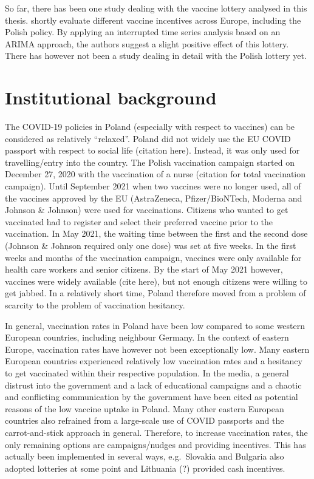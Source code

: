 \documentclass{scrbook}
\begin{document}
So far, there has been one study dealing with the vaccine lottery
analysed in this thesis. \textcite{kuznetsova_effectiveness_2022}
shortly evaluate different vaccine incentives across Europe, including
the Polish policy. By applying an interrupted time series analysis based
on an ARIMA approach, the authors suggest a slight positive effect of
this lottery. There has however not been a study dealing in detail with
the Polish lottery yet.

\section{Institutional background}

The COVID-19 policies in Poland (especially with respect to vaccines)
can be considered as relatively ``relaxed''. Poland did not widely use
the EU COVID passport with respect to social life (citation here).
Instead, it was only used for travelling/entry into the country. The
Polish vaccination campaign started on December 27, 2020 with the
vaccination of a nurse (citation for total vaccination campaign). Until
September 2021 when two vaccines were no longer used, all of the
vaccines approved by the EU (AstraZeneca, Pfizer/BioNTech, Moderna and
Johnson \& Johnson) were used for vaccinations. Citizens who wanted to
get vaccinated had to register and select their preferred vaccine prior
to the vaccination. In May 2021, the waiting time between the first and
the second dose (Johnson \& Johnson required only one dose) was set at
five weeks. In the first weeks and months of the vaccination campaign,
vaccines were only available for health care workers and senior
citizens. By the start of May 2021 however, vaccines were widely
available (cite here), but not enough citizens were willing to get
jabbed. In a relatively short time, Poland therefore moved from a
problem of scarcity to the problem of vaccination hesitancy.

In general, vaccination rates in Poland have been low compared to some
western European countries, including neighbour Germany. In the context
of eastern Europe, vaccination rates have however not been exceptionally
low. Many eastern European countries experienced relatively low
vaccination rates and a hesitancy to get vaccinated within their
respective population. In the media, a general distrust into the
government and a lack of educational campaigns
\parencite{noauthor_polands_2021} and a chaotic and conflicting
communication by the government \parencite{wanat_polands_2021} have been
cited as potential reasons of the low vaccine uptake in Poland. Many
other eastern European countries also refrained from a large-scale use
of COVID passports and the carrot-and-stick approach in general.
Therefore, to increase vaccination rates, the only remaining options are
campaigns/nudges and providing incentives. This has actually been
implemented in several ways, e.g.~Slovakia and Bulgaria also adopted
lotteries at some point and Lithuania (?) provided cash incentives.
\end{document}
